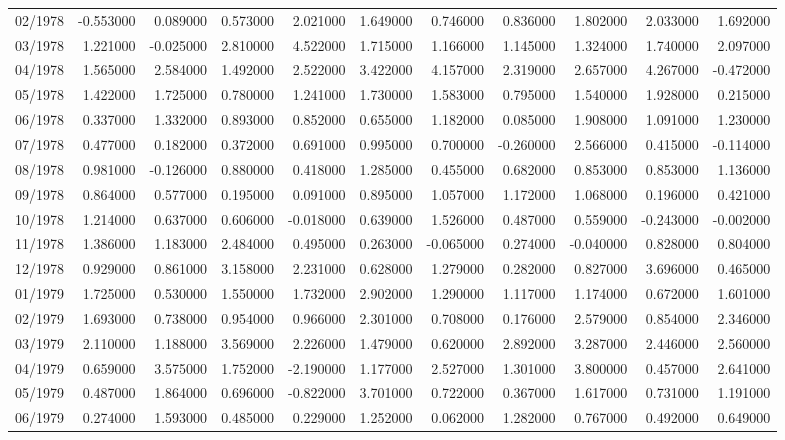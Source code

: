 \begin{tabular}{lrrrrrrrrrr}
02/1978 & -0.553000 & 0.089000 & 0.573000 & 2.021000 & 1.649000 & 0.746000 & 0.836000 & 1.802000 & 2.033000 & 1.692000 \\
03/1978 & 1.221000 & -0.025000 & 2.810000 & 4.522000 & 1.715000 & 1.166000 & 1.145000 & 1.324000 & 1.740000 & 2.097000 \\
04/1978 & 1.565000 & 2.584000 & 1.492000 & 2.522000 & 3.422000 & 4.157000 & 2.319000 & 2.657000 & 4.267000 & -0.472000 \\
05/1978 & 1.422000 & 1.725000 & 0.780000 & 1.241000 & 1.730000 & 1.583000 & 0.795000 & 1.540000 & 1.928000 & 0.215000 \\
06/1978 & 0.337000 & 1.332000 & 0.893000 & 0.852000 & 0.655000 & 1.182000 & 0.085000 & 1.908000 & 1.091000 & 1.230000 \\
07/1978 & 0.477000 & 0.182000 & 0.372000 & 0.691000 & 0.995000 & 0.700000 & -0.260000 & 2.566000 & 0.415000 & -0.114000 \\
08/1978 & 0.981000 & -0.126000 & 0.880000 & 0.418000 & 1.285000 & 0.455000 & 0.682000 & 0.853000 & 0.853000 & 1.136000 \\
09/1978 & 0.864000 & 0.577000 & 0.195000 & 0.091000 & 0.895000 & 1.057000 & 1.172000 & 1.068000 & 0.196000 & 0.421000 \\
10/1978 & 1.214000 & 0.637000 & 0.606000 & -0.018000 & 0.639000 & 1.526000 & 0.487000 & 0.559000 & -0.243000 & -0.002000 \\
11/1978 & 1.386000 & 1.183000 & 2.484000 & 0.495000 & 0.263000 & -0.065000 & 0.274000 & -0.040000 & 0.828000 & 0.804000 \\
12/1978 & 0.929000 & 0.861000 & 3.158000 & 2.231000 & 0.628000 & 1.279000 & 0.282000 & 0.827000 & 3.696000 & 0.465000 \\
01/1979 & 1.725000 & 0.530000 & 1.550000 & 1.732000 & 2.902000 & 1.290000 & 1.117000 & 1.174000 & 0.672000 & 1.601000 \\
02/1979 & 1.693000 & 0.738000 & 0.954000 & 0.966000 & 2.301000 & 0.708000 & 0.176000 & 2.579000 & 0.854000 & 2.346000 \\
03/1979 & 2.110000 & 1.188000 & 3.569000 & 2.226000 & 1.479000 & 0.620000 & 2.892000 & 3.287000 & 2.446000 & 2.560000 \\
04/1979 & 0.659000 & 3.575000 & 1.752000 & -2.190000 & 1.177000 & 2.527000 & 1.301000 & 3.800000 & 0.457000 & 2.641000 \\
05/1979 & 0.487000 & 1.864000 & 0.696000 & -0.822000 & 3.701000 & 0.722000 & 0.367000 & 1.617000 & 0.731000 & 1.191000 \\
06/1979 & 0.274000 & 1.593000 & 0.485000 & 0.229000 & 1.252000 & 0.062000 & 1.282000 & 0.767000 & 0.492000 & 0.649000 \\

\end{tabular}
